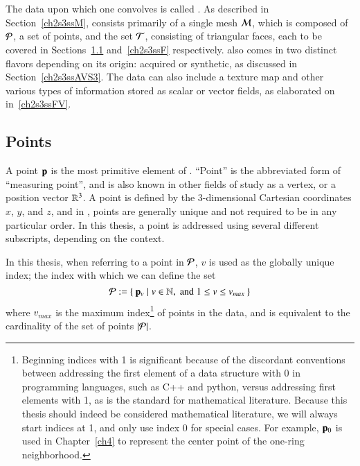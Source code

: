 \section{\tdd}
\label{ch2s3}
The data upon which one convolves  is called \tdd{}. As described in Section~\ref{ch2s3ssM}, \tdd{} consists primarily of a single mesh $\mathcal{M}$, which is composed of $\mathcal{P}$, a set of points, and the set $\mathcal{T}$, consisting of triangular faces, each to be covered in Sections~\ref{ch2s3ssP} and~\ref{ch2s3ssF} respectively. \tdd{} also comes in two distinct flavors depending on its origin: acquired or synthetic, as discussed in Section~\ref{ch2s3ssAVS3}. The data can also include a texture map and other various types of information stored as scalar or vector fields, as elaborated on in~\ref{ch2s3ssFV}.

%
%
%
\subsection{Points}
\label{ch2s3ssP}
A point $\mathbf{p}$ is the most primitive element of \tdd{}. ``Point'' is the abbreviated form of ``measuring point'', and is also known in other fields of study as a vertex, or a position vector $\mathbb{R}^{3}$. A point is defined by the 3-dimensional Cartesian coordinates $x$, $y$, and $z$, and in \tdd{}, points are generally unique and not required to be in any particular order. In this thesis, a point is addressed using several different subscripts, depending on the context.

In this thesis, when referring to a point in $\mathcal{P}$, $v$ is used as the globally unique index; the index with which we can define the set
%
\begin{equation}
	\mathcal{P} := \left \{\:\mathbf{p}_v \mid v \in \mathbb{N}, \;\text{and}\; 1\leq v \leq v_{max}\:\right \}
	\label{eq:defineSetOfPoints}
\end{equation}
%
where $v_{max}$ is the maximum index\footnote{\label{indicesFootnote}Beginning indices with 1 is significant because of the discordant conventions between addressing the first element of a data structure with 0 in programming languages, such as C++ and python, versus addressing first elements with 1, as is the standard for mathematical literature. Because this thesis should indeed be considered mathematical literature, we will always start indices at 1, and only use index 0 for special cases. For example, $\mathbf{p}_0$ is used in Chapter~\ref{ch4} to represent the center point of the one-ring neighborhood.} of points in the data, and is equivalent to the cardinality of the set of points $|\mathcal{P}|$.%
%
%


